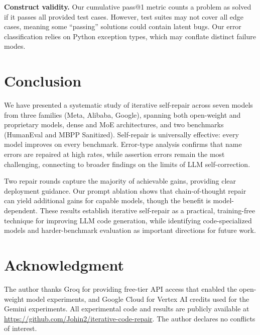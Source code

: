 \documentclass[conference]{IEEEtran}
\begin{document}
\textbf{Construct validity.}
Our cumulative pass@1 metric counts a problem as solved if it passes all provided test cases. However, test suites may not cover all edge cases, meaning some ``passing'' solutions could contain latent bugs. Our error classification relies on Python exception types, which may conflate distinct failure modes.

\section{Conclusion}
\label{sec:conclusion}

We have presented a systematic study of iterative self-repair across seven models from three families (Meta, Alibaba, Google), spanning both open-weight and proprietary models, dense and MoE architectures, and two benchmarks (HumanEval and MBPP Sanitized). Self-repair is universally effective: every model improves on every benchmark. Error-type analysis confirms that name errors are repaired at high rates, while assertion errors remain the most challenging, connecting to broader findings on the limits of LLM self-correction.

Two repair rounds capture the majority of achievable gains, providing clear deployment guidance. Our prompt ablation shows that chain-of-thought repair can yield additional gains for capable models, though the benefit is model-dependent. These results establish iterative self-repair as a practical, training-free technique for improving LLM code generation, while identifying code-specialized models and harder-benchmark evaluation as important directions for future work.

\section*{Acknowledgment}

The author thanks Groq for providing free-tier API access that enabled the open-weight model experiments, and Google Cloud for Vertex AI credits used for the Gemini experiments. All experimental code and results are publicly available at \url{https://github.com/Johin2/iterative-code-repair}. The author declares no conflicts of interest.



\end{document}
